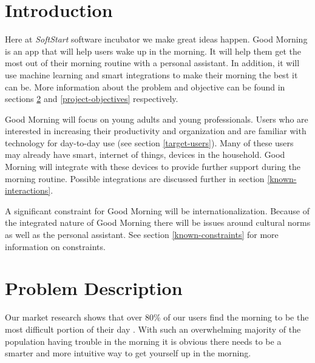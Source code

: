 \documentclass[11pt]{article}
\begin{document}
    
    
\setcounter{page}{1}
\glsresetall
\renewcommand{\arraystretch}{1.5} %
    
    
%
\section{Introduction}\label{introduction}

Here at \textit{SoftStart} software incubator we make great ideas happen.
Good Morning is an app that will help users wake up in the
morning. It will help them get the most out of their morning routine with a personal assistant. In addition, it will use machine learning and smart integrations to make their morning the best it can be. More information about the problem and objective can be found in sections \ref{problem-description} and \ref{project-objectives} respectively.


Good Morning will focus on young adults and young professionals. Users who are interested in increasing their productivity and organization and are familiar with technology for day-to-day use (see section \ref{target-users}). Many of these users may already have smart, internet of things, devices in the household. Good Morning will integrate with these devices to provide further support during the morning routine. Possible integrations are discussed further in section \ref{known-interactions}.

A significant constraint for Good Morning will be internationalization. Because of the integrated nature of Good Morning there will be issues around cultural norms as well as the personal assistant. See section \ref{known-constraints} for more information on constraints.

%
\section{Problem Description}\label{problem-description}

Our market research shows that over 80\% of our users find the morning to be the most difficult portion of their day \cite{marketResearch}. With such an overwhelming majority of the population having trouble in the morning it is obvious there needs to be a smarter and more intuitive way to get yourself up in the morning.
\end{document}
